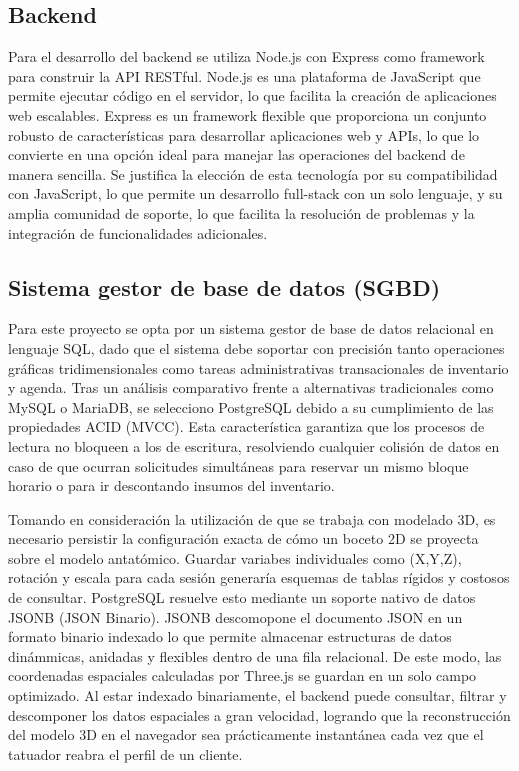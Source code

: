\subsection{Backend}

Para el desarrollo del backend se utiliza Node.js \cite{nodejs} con Express \cite{express} como framework para construir la API RESTful\cite{fielding2000}. Node.js es una plataforma de JavaScript que permite ejecutar código en el servidor, lo que facilita la creación de aplicaciones web escalables. Express es un framework flexible que proporciona un conjunto robusto de características para desarrollar aplicaciones web y APIs, lo que lo convierte en una opción ideal para manejar las operaciones del backend de manera sencilla. Se justifica la elección de esta tecnología por su compatibilidad con JavaScript, lo que permite un desarrollo full-stack con un solo lenguaje, y su amplia comunidad de soporte, lo que facilita la resolución de problemas y la integración de funcionalidades adicionales.

\subsection{Sistema gestor de base de datos (SGBD) }

Para este proyecto se opta por un sistema gestor de base de datos relacional en lenguaje SQL\cite{iso9075}, dado que el sistema debe soportar con precisión tanto operaciones gráficas tridimensionales como tareas administrativas transacionales de inventario y agenda. Tras un análisis comparativo frente a alternativas tradicionales como MySQL\cite{mysql} o MariaDB\cite{mariadb}, se selecciono PostgreSQL\cite{postgresql} debido a su cumplimiento de las propiedades ACID (MVCC)\cite{harder1983}. Esta característica garantiza que los procesos de lectura no bloqueen a los de escritura, resolviendo cualquier colisión de datos en caso de que ocurran solicitudes simultáneas para reservar un mismo bloque horario o para ir descontando insumos del inventario.

Tomando en consideración la utilización de que se trabaja con modelado 3D, es necesario persistir la configuración exacta de cómo un boceto 2D se proyecta sobre el modelo antatómico. Guardar variabes individuales como (X,Y,Z), rotación y escala para cada sesión generaría esquemas de tablas rígidos y costosos de consultar. PostgreSQL resuelve esto mediante un soporte nativo de datos JSONB (JSON Binario)\cite{postgresjson}. JSONB descomopone el documento JSON\cite{bray2017} en un formato binario indexado lo que permite almacenar estructuras de datos dinámmicas, anidadas y flexibles dentro de una fila relacional. De este modo, las coordenadas espaciales calculadas por Three.js se guardan en un solo campo optimizado. Al estar indexado binariamente, el backend puede consultar, filtrar y descomponer los datos espaciales a gran velocidad, logrando que la reconstrucción del modelo 3D en el navegador sea prácticamente instantánea cada vez que el tatuador reabra el perfil de un cliente.

